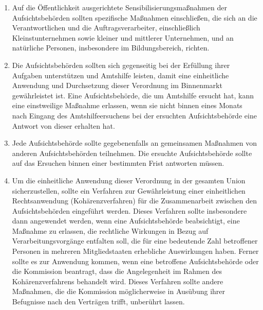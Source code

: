\begin{enumerate}

   \item Auf die Öffentlichkeit ausgerichtete Sensibilisierungsmaßnahmen der Aufsichtsbehörden sollten spezifische
    Maßnahmen einschließen, die sich an die Verantwortlichen und die Auftragsverarbeiter, einschließlich
    Kleinstunternehmen sowie kleiner und mittlerer Unternehmen, und an natürliche Personen, insbesondere im
    Bildungsbereich, richten.%
   \label{eg:132}
   

   \item Die Aufsichtsbehörden sollten sich gegenseitig bei der Erfüllung ihrer Aufgaben unterstützen und Amtshilfe
    leisten, damit eine einheitliche Anwendung und Durchsetzung dieser Verordnung im Binnenmarkt gewährleistet ist.
    Eine Aufsichtsbehörde, die um Amtshilfe ersucht hat, kann eine einstweilige Maßnahme erlassen, wenn sie nicht
    binnen eines Monats nach Eingang des Amtshilfeersuchens bei der ersuchten Aufsichtsbehörde eine Antwort von dieser
    erhalten hat.%
   \label{eg:133}
   

   \item Jede Aufsichtsbehörde sollte gegebenenfalls an gemeinsamen Maßnahmen von anderen Aufsichtsbehörden teilnehmen.
    Die ersuchte Aufsichtsbehörde sollte auf das Ersuchen binnen einer bestimmten Frist antworten müssen.%
   \label{eg:134}
   

   \item Um die einheitliche Anwendung dieser Verordnung in der gesamten Union sicherzustellen, sollte ein Verfahren zur
    Gewährleistung einer einheitlichen Rechtsanwendung (Kohärenzverfahren) für die Zusammenarbeit zwischen den
    Aufsichtsbehörden eingeführt werden. Dieses Verfahren sollte insbesondere dann angewendet werden, wenn eine
    Aufsichtsbehörde beabsichtigt, eine Maßnahme zu erlassen, die rechtliche Wirkungen in Bezug auf
    Verarbeitungsvorgänge entfalten soll, die für eine bedeutende Zahl betroffener Personen in mehreren Mitgliedstaaten
    erhebliche Auswirkungen haben. Ferner sollte es zur Anwendung kommen, wenn eine betroffene Aufsichtsbehörde oder
    die Kommission beantragt, dass die Angelegenheit im Rahmen des Kohärenzverfahrens behandelt wird. Dieses Verfahren
    sollte andere Maßnahmen, die die Kommission möglicherweise in Ausübung ihrer Befugnisse nach den Verträgen trifft,
    unberührt lassen.%
   \label{eg:135}
   

\end{enumerate}
